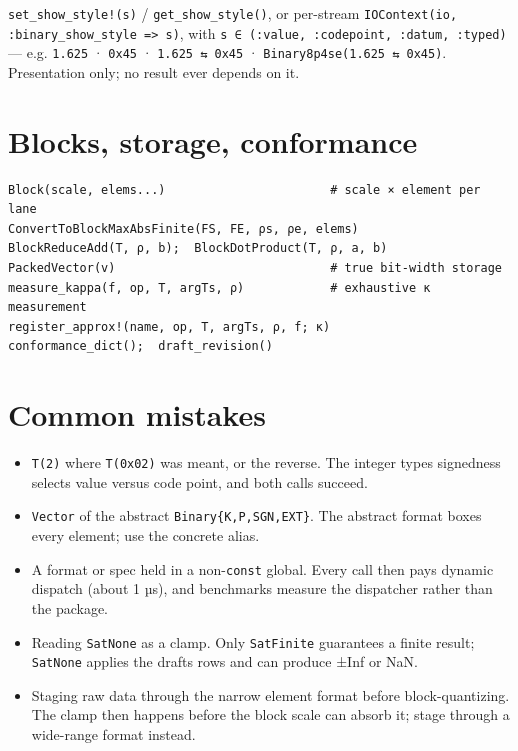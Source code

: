 \texttt{set\_\allowbreak{}show\_\allowbreak{}style!(s)} / \texttt{get\_\allowbreak{}show\_\allowbreak{}style()}, or per-stream \texttt{IOContext(\allowbreak{}io, :binary\_\allowbreak{}show\_\allowbreak{}style => s)}, with \texttt{s ∈ (\allowbreak{}:value, :codepoint, :datum, :typed)} — e.g. \texttt{1.625} · \texttt{0x45} · \texttt{1.625 ⇆ 0x45} · \texttt{Binary8p4se(\allowbreak{}1.625 ⇆ 0x45)}. Presentation only; no result ever depends on it.



\section{Blocks, storage, conformance}



\label{12630375890338194343}{}



\begin{verbatim}
Block(scale, elems...)                       # scale × element per lane
ConvertToBlockMaxAbsFinite(FS, FE, ρs, ρe, elems)
BlockReduceAdd(T, ρ, b);  BlockDotProduct(T, ρ, a, b)
PackedVector(v)                              # true bit-width storage
measure_kappa(f, op, T, argTs, ρ)            # exhaustive κ measurement
register_approx!(name, op, T, argTs, ρ, f; κ)
conformance_dict();  draft_revision()
\end{verbatim}



\section{Common mistakes}



\label{8766050074116339039}{}


\begin{itemize}
\item[1. ] \texttt{T(2)} where \texttt{T(0x02)} was meant, or the reverse. The integer type{\textquotesingle}s signedness selects value versus code point, and both calls succeed.


\item[2. ] \texttt{Vector} of the abstract \texttt{Binary\{K,P,SGN,EXT\}}. The abstract format boxes every element; use the concrete alias.


\item[3. ] A format or spec held in a non-\texttt{const} global. Every call then pays dynamic dispatch (about 1 µs), and benchmarks measure the dispatcher rather than the package.


\item[4. ] Reading \texttt{SatNone} as a clamp. Only \texttt{SatFinite} guarantees a finite result; \texttt{SatNone} applies the draft{\textquotesingle}s rows and can produce ±Inf or NaN.


\item[5. ] Staging raw data through the narrow element format before block-quantizing. The clamp then happens before the block scale can absorb it; stage through a wide-range format instead.

\end{itemize}




